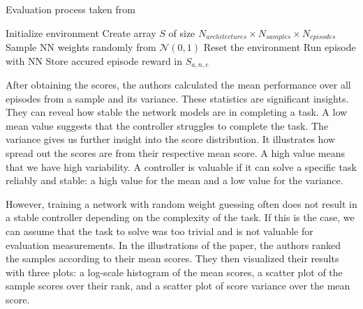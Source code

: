 \begin{algorithm}
\caption{Evaluation process taken from \cite{oller_analyzing_2020}}
\begin{algorithmic}[1]
\State Initialize environment
\State Create array $S$ of size $N_{architectures} \times N_{samples} \times N_{episodes}$
    \State Sample NN weights randomly from $\mathcal{N}(0,1)$
      \State Reset the environment
      \State Run episode with NN
      \State Store accured episode reward in $S_{a,n,e}$
    \EndFor
\EndFor
\end{algorithmic}
\label{alg:environment-evaluation}
\end{algorithm}

After obtaining the scores, the authors calculated the mean performance over all episodes from a sample and its variance. These statistics are significant insights. They can reveal how stable the network models are in completing a task. A low mean value suggests that the controller struggles to complete the task. The variance gives us further insight into the score distribution. It illustrates how spread out the scores are from their respective mean score. A high value means that we have high variability. A controller is valuable if it can solve a specific task reliably and stable: a high value for the mean and a low value for the variance.

However, training a network with random weight guessing often does not result in a stable controller depending on the complexity of the task. If this is the case, we can assume that the task to solve was too trivial and is not valuable for evaluation measurements. In the illustrations of the paper, the authors ranked the samples according to their mean scores. They then visualized their results with three plots: a log-scale histogram of the mean scores, a scatter plot of the sample scores over their rank, and a scatter plot of score variance over the mean score.

